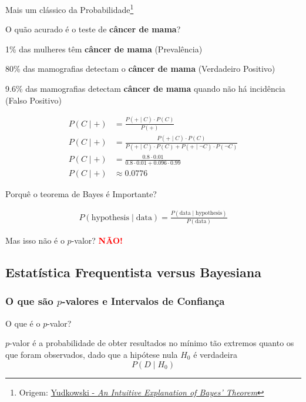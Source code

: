 \begin{frame}{Mais um clássico da Probabilidade\footnote{Origem: \href{https://www.yudkowsky.net/rational/bayes}{Yudkowski - \textit{An Intuitive Explanation of Bayes’ Theorem}}}}
    \begin{exemplo}
        \small
        O quão acurado é o teste de \textbf{câncer de mama}?
        \begin{vfilleditems}
            \item \footnotesize 1\% das mulheres têm \textbf{câncer de mama} (Prevalência)
            \item \footnotesize 80\% das mamografias detectam o \textbf{câncer de mama} (Verdadeiro Positivo)
            \item \footnotesize 9.6\% das mamografias detectam \textbf{câncer de mama} quando não há incidência (Falso Positivo)
        \end{vfilleditems}
        $$
        \begin{aligned}
            P(C \mid +) &= \frac{P(+ \mid C) \cdot P(C)}{P(+)} \\
            P(C \mid +) &= \frac{P(+ \mid C) \cdot P(C)}{P(+ \mid C) \cdot P(C) + P(+ \mid \neg C) \cdot P(\neg C)} \\
            P(C \mid +) &= \frac{0.8 \cdot 0.01}{0.8 \cdot 0.01 + 0.096 \cdot 0.99} \\
            P(C \mid +) &\approx 0.0776
        \end{aligned}
        $$
    \end{exemplo}
\end{frame}


\begin{frame}{Porquê o teorema de Bayes é Importante?}
    \begin{idea}
        $$
        \begin{aligned}
            P(\text{hypothesis} \mid \text{data}) = \frac{P(\text{data} \mid \text{hypothesis})}{P(\text{data})}
        \end{aligned}
        $$
    \end{idea}
    Mas isso não é o $p$-valor? \textcolor{red}{\textbf{NÃO!}}
\end{frame}

\subsection{Estatística Frequentista versus Bayesiana}
\subsubsection{O que são $p$-valores e Intervalos de Confiança}
\begin{frame}{O que é o $p$-valor?}
    \begin{defn}[$p$-valor]
        $p$-valor é a probabilidade de obter resultados no mínimo tão
        extremos quanto os que foram observados, dado que a hipótese nula
        $H_0$ é verdadeira
        $$P(D \mid H_0)$$
    \end{defn}
\end{frame}

